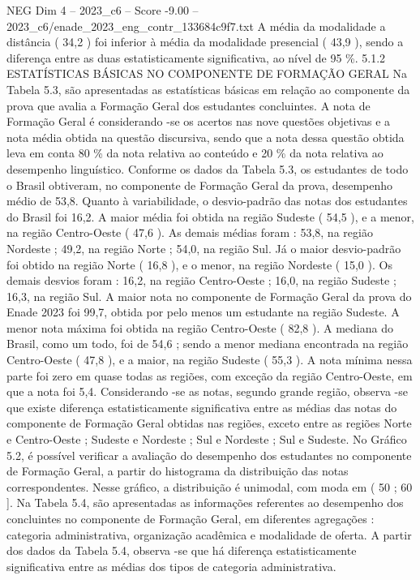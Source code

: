 \begin{textsample}{NEG Dim 4 – 2023\_c6 – Score -9.00 – 2023\_c6/enade\_2023\_eng\_contr\_133684c9f7.txt}
A média da modalidade a distância ( 34,2 ) foi inferior à média da modalidade presencial ( 43,9 ), sendo a diferença entre as duas estatisticamente significativa, ao nível de 95 \%. 5.1.2 ESTATÍSTICAS BÁSICAS NO COMPONENTE DE FORMAÇÃO GERAL Na Tabela 5.3, são apresentadas as estatísticas básicas em relação ao componente da prova que avalia a Formação Geral dos estudantes concluintes.
A nota de Formação Geral é considerando -se os acertos nas nove questões objetivas e a nota média obtida na questão discursiva, sendo que a nota dessa questão obtida leva em conta 80 \% da nota relativa ao conteúdo e 20 \% da nota relativa ao desempenho linguístico.
Conforme os dados da Tabela 5.3, os estudantes de todo o Brasil obtiveram, no componente de Formação Geral da prova, desempenho médio de 53,8.
Quanto à variabilidade, o desvio-padrão das notas dos estudantes do Brasil foi 16,2.
A maior média foi obtida na região Sudeste ( 54,5 ), e a menor, na região Centro-Oeste ( 47,6 ).
As demais médias foram : 53,8, na região Nordeste ; 49,2, na região Norte ; 54,0, na região Sul.
Já o maior desvio-padrão foi obtido na região Norte ( 16,8 ), e o menor, na região Nordeste ( 15,0 ).
Os demais desvios foram : 16,2, na região Centro-Oeste ; 16,0, na região Sudeste ; 16,3, na região Sul.
A maior nota no componente de Formação Geral da prova do Enade 2023 foi 99,7, obtida por pelo menos um estudante na região Sudeste.
A menor nota máxima foi obtida na região Centro-Oeste ( 82,8 ).
A mediana do Brasil, como um todo, foi de 54,6 ; sendo a menor mediana encontrada na região Centro-Oeste ( 47,8 ), e a maior, na região Sudeste ( 55,3 ).
A nota mínima nessa parte foi zero em quase todas as regiões, com exceção da região Centro-Oeste, em que a nota foi 5,4.
Considerando -se as notas, segundo grande região, observa -se que existe diferença estatisticamente significativa entre as médias das notas do componente de Formação Geral obtidas nas regiões, exceto entre as regiões Norte e Centro-Oeste ; Sudeste e Nordeste ; Sul e Nordeste ; Sul e Sudeste.
No Gráfico 5.2, é possível verificar a avaliação do desempenho dos estudantes no componente de Formação Geral, a partir do histograma da distribuição das notas correspondentes.
Nesse gráfico, a distribuição é unimodal, com moda em ( 50 ; 60 ].
Na Tabela 5.4, são apresentadas as informações referentes ao desempenho dos concluintes no componente de Formação Geral, em diferentes agregações : categoria administrativa, organização acadêmica e modalidade de oferta.
A partir dos dados da Tabela 5.4, observa -se que há diferença estatisticamente significativa entre as médias dos tipos de categoria administrativa.

\end{textsample}
